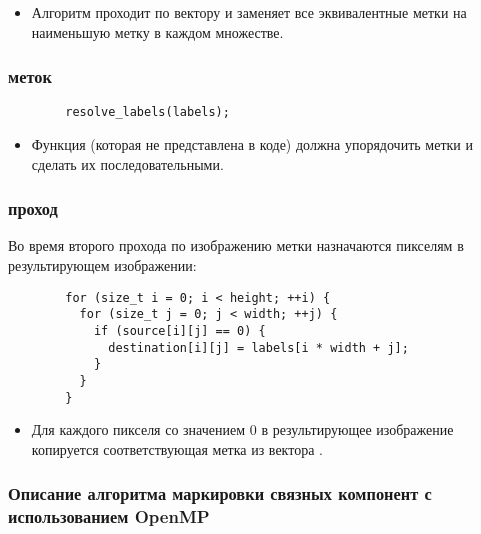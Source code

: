 \documentclass[a4paper, 14pt]{article}
\begin{document}
        \begin{itemize}
          \item Алгоритм проходит по вектору  и заменяет все эквивалентные метки на наименьшую метку в каждом множестве.
        \end{itemize}
        
        \subsubsection*{ меток}
        \begin{verbatim}
        resolve_labels(labels);
        \end{verbatim}
        
        \begin{itemize}
          \item Функция  (которая не представлена в коде) должна упорядочить метки и сделать их последовательными.
        \end{itemize}

        \newpage
        \subsubsection*{ проход}
        
        Во время второго прохода по изображению метки назначаются пикселям в результирующем изображении:
        
        \begin{verbatim}
        for (size_t i = 0; i < height; ++i) {
          for (size_t j = 0; j < width; ++j) {
            if (source[i][j] == 0) {
              destination[i][j] = labels[i * width + j];
            }
          }
        }
        \end{verbatim}
        
        \begin{itemize}
          \item Для каждого пикселя  со значением 0 в результирующее изображение  копируется соответствующая метка из вектора .
        \end{itemize}

        \newpage
        \subsubsection*{\centering Описание алгоритма маркировки связных компонент с использованием OpenMP}
\end{document}
